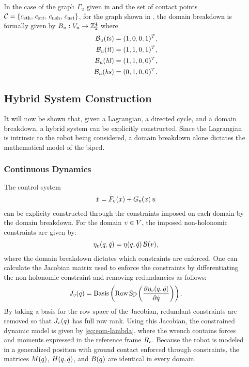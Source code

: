 \begin{exmp} \label{ex:domainbreakdown}
  In the case of the graph $\Gamma_{u}$ given in  and
  the set of contact points $\mathcal{C} =  \{c_{\mathrm{sth}}, \, c_{\mathrm{stt}}, \, c_{\mathrm{nsh}}, \, c_{\mathrm{nst}}\}$, for
  the graph shown in , the domain breakdown is formally
  given by  $B_{u} : V_{u} \to \mathbb{Z}_{2}^{4}$ where
  \begin{align}
    \nonumber
    \mathcal{B}_{u}(\mathit{ts}) &= (1, 0, 0, 1)^{T},\\
    \nonumber
    \mathcal{B}_{u}(\mathit{tl}) &= (1, 1, 0, 1)^{T},\\
    \nonumber
    \mathcal{B}_{u}(\mathit{hl}) &= (1, 1, 0, 0)^{T},\\
    \mathcal{B}_{u}(\mathit{hs}) &= (0, 1, 0, 0)^{T}.
    \label{eq:domainbreakdownvectors}
  \end{align}
\end{exmp}


\subsection{Hybrid System Construction}

It will now be shown that, given a Lagrangian, a directed cycle, and a domain
breakdown, a hybrid system can be explicitly constructed.
%
Since the Lagrangian is intrinsic to the robot being considered, a domain
breakdown alone dictates the mathematical model of the biped.


\subsubsection{Continuous Dynamics}

The control system
\begin{align*}
  {\dot {x}} = F_{v}(x) + G_{v}(x) \, u
\end{align*}
can be explicity constructed through the constraints imposed on each domain by
the domain breakdown.
%
For the domain $v \in V$, the imposed non-holonomic constraints are given by:
%
\begin{align*}
  \eta_{v}(q, \dot{q}) = \eta(q, \dot{q}) \, \mathcal{B}(v),
\end{align*}
%
where the domain breakdown dictates which constraints are enforced.
%
One can calculate the Jacobian matrix used to enforce the constraints by
differentiating the non-holonomic constraint and removing redundancies as follows:
%
\begin{align*}
  J_{v}(q) = \operatorname*{Basis}\left( \operatorname*{Row\,Sp}\left( \frac{\partial{\eta_{v}(q, \dot{q})}}{\partial{\dot{q}}} \right)
  \right).
\end{align*}
%
By taking a basis for the row space of the Jacobian, redundant constraints are
removed so that $J_{v}(q)$ has full row rank.
%
Using this Jacobian, the constrained dynamic model is given by
\eqref{eq:eom-lambda}.
where the wrench contains forces and moments expressed in the reference frame
$R_{c}$.
%
Because the robot is modeled in a generalized position with ground contact
enforced through constraints, the matrices $M(q)$, $H(q, \dot{q})$, and
$B(q)$ are identical in every domain.
%


